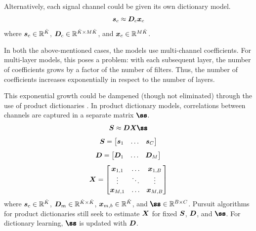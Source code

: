 Alternatively, each signal channel could be given its own dictionary model.
%
\begin{equation}
\bm{s}_c \approx \bm{D}_c\bm{x}_c
\end{equation}
%
where $\bm{s}_c \in \mathbb{R}^{\hat{K}}$, $\bm{D}_c \in \mathbb{R}^{\hat{K} \times M\hat{K}}$, and $\bm{x}_{c} \in \mathbb{R}^{M\hat{K}}$.

In both the above-mentioned cases, the models use multi-channel coefficients. For multi-layer models, this poses a problem: with each subsequent layer, the number of coefficients grows by a factor of the number of filters. Thus, the number of coefficients increases exponentially in respect to the number of layers.

This exponential growth could be dampened (though not eliminated) through the use of product dictionaries \cite{garcia2018multichannel}. In product dictionary models, correlations between channels are captured in a separate matrix $\mSS$.
%
\begin{equation}
\mS \approx \mD\mX\mSS
\end{equation}
\begin{equation}
\bm{S} = \begin{bmatrix} \bm{s}_1 & \hdots & \bm{s}_C \end{bmatrix}
\end{equation}
\begin{equation}
\bm{D} = \begin{bmatrix} \bm{D}_1 & \hdots & \bm{D}_M \end{bmatrix}
\end{equation}
\begin{equation}
\bm{X} = \begin{bmatrix} \bm{x}_{1,1} & \hdots & \bm{x}_{1,B} \\ \vdots & \ddots & \vdots \\ \bm{x}_{M,1} & \hdots & \bm{x}_{M,B} \end{bmatrix}
\end{equation}
%
where $\bm{s}_c \in \mathbb{R}^{\hat{K}}$, $\bm{D}_m \in \mathbb{R}^{\hat{K} \times \hat{K}}$, $\bm{x}_{m,b} \in \mathbb{R}^{\hat{K}}$, and $\mSS \in \R^{B \times C}$. Pursuit algorithms for product dictionaries still seek to estimate $\bm{X}$ for fixed $\bm{S}$, $\bm{D}$, and $\mSS$. For dictionary learning, $\mSS$ is updated with $\bm{D}$.

